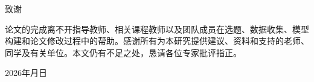 \clearpage
{}
{}

\begin{center}
    {\FZhei{}\setlength{\baselineskip}{24pt}\selectfont 致谢\par}
\end{center}

论文的完成离不开指导教师、相关课程教师以及团队成员在选题、数据收集、模型构建和论文修改过程中的帮助。感谢所有为本研究提供建议、资料和支持的老师、同学及有关单位。本文仍有不足之处，恳请各位专家批评指正。

\vspace{2em}

\begin{flushright}
2026年\quad 月\quad 日
\end{flushright}
